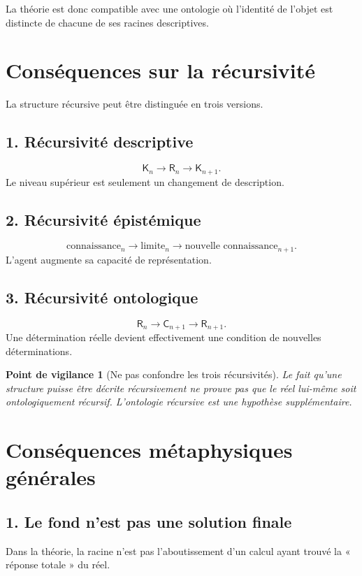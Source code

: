 \documentclass[11pt,a4paper]{article}
\newtheorem{warning}{Point de vigilance}[section]
\newcommand{\Rac}{\mathsf{R}}
\newcommand{\Cadre}{\mathsf{K}}
\newcommand{\Con}{\mathsf{C}}
\begin{document}
La théorie est donc compatible avec une ontologie où l'identité de l'objet
est distincte de chacune de ses racines descriptives.

\section{Conséquences sur la récursivité}

La structure récursive peut être distinguée en trois versions.

\subsection{1. Récursivité descriptive}
\[
\Cadre_n\to\Rac_n\to\Cadre_{n+1}.
\]
Le niveau supérieur est seulement un changement de description.

\subsection{2. Récursivité épistémique}
\[
\text{connaissance}_n
\to
\text{limite}_n
\to
\text{nouvelle connaissance}_{n+1}.
\]
L'agent augmente sa capacité de représentation.

\subsection{3. Récursivité ontologique}
\[
\Rac_n\to\Con_{n+1}\to\Rac_{n+1}.
\]
Une détermination réelle devient effectivement une condition de nouvelles
déterminations.

\begin{warning}[Ne pas confondre les trois récursivités]
Le fait qu'une structure puisse être décrite récursivement ne prouve pas que le
réel lui-même soit ontologiquement récursif. L'ontologie récursive est une
hypothèse supplémentaire.
\end{warning}

\section{Conséquences métaphysiques générales}

\subsection{1. Le fond n'est pas une solution finale}

Dans la théorie, la racine n'est pas l'aboutissement d'un calcul ayant trouvé
la « réponse totale » du réel.
\end{document}
